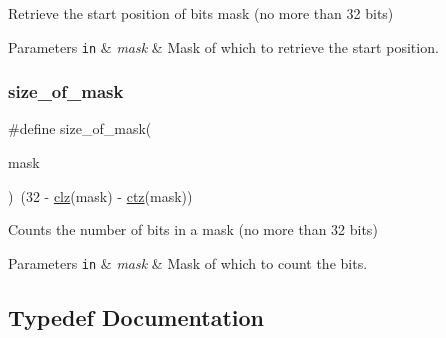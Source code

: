 Retrieve the start position of bits mask (no more than 32 bits) 


\begin{DoxyParams}[1]{Parameters}
\mbox{\tt in}  & {\em mask} & Mask of which to retrieve the start position. \\
\hline
\end{DoxyParams}
\mbox{\label{group__doc__driver__hal__utils__macro_gacb24f277663a5c87482fbcdbef5f2bd2}} 
\subsubsection{\texorpdfstring{size\+\_\+of\+\_\+mask}{size\_of\_mask}}
{\footnotesize\ttfamily \#define size\+\_\+of\+\_\+mask(\begin{DoxyParamCaption}\item[{}]{mask }\end{DoxyParamCaption})~(32 -\/ \hyperlink{group__doc__driver__hal__utils__macro_ga004f88903a09b9c23017e697eaf5a845}{clz}(mask) -\/ \hyperlink{group__doc__driver__hal__utils__macro_gab069bfec305db5213465d3b689836404}{ctz}(mask))}



Counts the number of bits in a mask (no more than 32 bits) 


\begin{DoxyParams}[1]{Parameters}
\mbox{\tt in}  & {\em mask} & Mask of which to count the bits. \\
\hline
\end{DoxyParams}


\subsection{Typedef Documentation}
\mbox{\label{group__doc__driver__hal__utils__macro_gae40b38bc5f5a5bd452bdd59c67d9a9cf}} 
